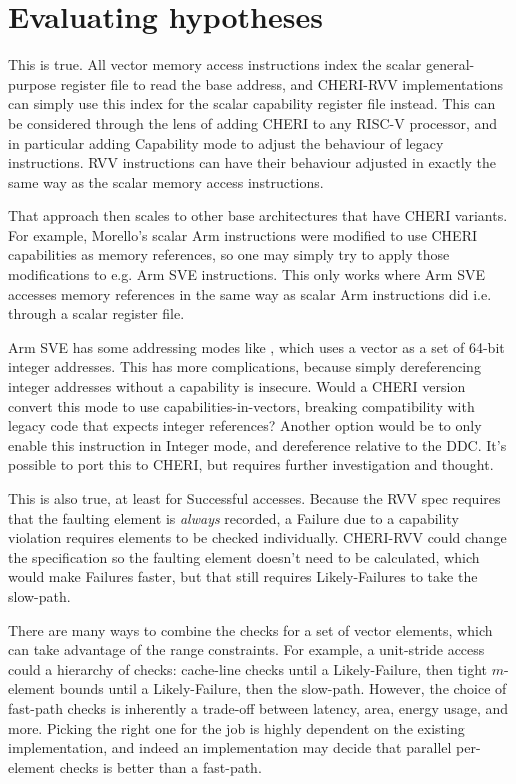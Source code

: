 \section{Evaluating hypotheses}

This is true.
All vector memory access instructions index the scalar general-purpose register file to read the base address, and CHERI-RVV implementations can simply use this index for the scalar capability register file instead.
This can be considered through the lens of adding CHERI to any RISC-V processor, and in particular adding Capability mode to adjust the behaviour of legacy instructions.
RVV instructions can have their behaviour adjusted in exactly the same way as the scalar memory access instructions.

That approach then scales to other base architectures that have CHERI variants.
For example, Morello's scalar Arm instructions were modified to use CHERI capabilities as memory references\cite[Section 1.3]{armltdMorelloArchitectureReference2021}, so one may simply try to apply those modifications to e.g. Arm SVE instructions.
This only works where Arm SVE accesses memory references in the same way as scalar Arm instructions did i.e. through a scalar register file.

Arm SVE has some addressing modes like , which uses a vector as a set of 64-bit integer addresses\cite{armltdArmCompilerScalable2019}.
This has more complications, because simply dereferencing integer addresses without a capability is insecure.
Would a CHERI version convert this mode to use capabilities-in-vectors, breaking compatibility with legacy code that expects integer references?
Another option would be to only enable this instruction in Integer mode, and dereference relative to the DDC.
It's possible to port this to CHERI, but requires further investigation and thought.

This is also true, at least for Successful accesses.
Because the RVV spec requires that the faulting element is \emph{always} recorded\cite[Section 17]{specification-RVV-v1.0}, a Failure due to a capability violation requires elements to be checked individually.
CHERI-RVV could change the specification so the faulting element doesn't need to be calculated, which would make Failures faster, but that still requires Likely-Failures to take the slow-path.

There are many ways to combine the checks for a set of vector elements, which can take advantage of the range constraints.
For example, a unit-stride access could a hierarchy of checks: cache-line checks until a Likely-Failure, then tight $m$-element bounds until a Likely-Failure, then the slow-path.
However, the choice of fast-path checks is inherently a trade-off between latency, area, energy usage, and more.
Picking the right one for the job is highly dependent on the existing implementation, and indeed an implementation may decide that parallel per-element checks is better than a fast-path.
